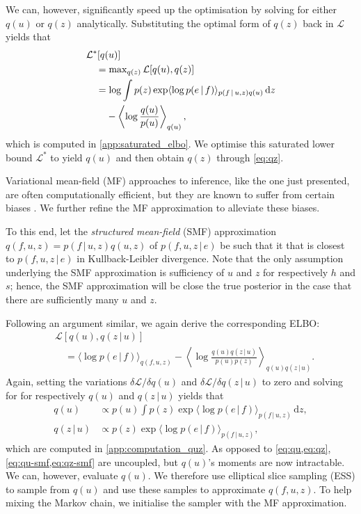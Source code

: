 \documentclass{article}
\renewcommand{\max}{\operatorname{max}}
\newcommand{\id}[1]{\, \mathrm{d} #1}     %
\newcommand{\cond}{\, | \,}               %
\renewcommand{\ll}{\left}
\newcommand{\rr}{\right}
\newcommand{\la}{\langle}
\newcommand{\ra}{\rangle}
\newcommand{\phan}[1]{\hphantom{#1\;}}
\begin{document}
We can, however, significantly speed up the optimisation by solving for either $q(u)$ or $q(z)$ analytically. Substituting the optimal form of $q(z)$ back in $\mathcal{L}$ yields that
\begin{align}
    &\mathcal{L}^*[q(u)] \nonumber\\
    &\quad=\max_{q(z)} \mathcal{L}[q(u),q(z)]\nonumber\\
    &\quad= \log \int p(z)\exp \la \log p(e\cond f) \ra_{p(f\cond u, z)q(u)} \id{z} \nonumber\\
    &\quad\phan{=}-\ll\la\log\frac{q(u)}{p(u)}\rr\ra_{q(u)},\label{eq:saturated_elbo}
\end{align}
which is computed in \cref{app:saturated_elbo}. We optimise this saturated lower bound $\mathcal{L}^*$ to yield $q(u)$ and then obtain $q(z)$ through \cref{eq:qz}.

Variational mean-field (MF) approaches to inference, like the one just presented, are often computationally efficient, but they are known to suffer from certain biases \cite{MacKay:2002:Information_Theory_Learning,Turner:2011:Two_Problems_With_Variational_Expectation,Murphy:2012:Probabilistic_Perspective}. We further refine the MF approximation to alleviate these biases.

To this end, let the \textit{structured mean-field} (SMF) approximation $q(f,u,z)=p(f\cond u, z)q(u,z)$ of $p(f,u,z\cond e)$ be such that it that is closest to $p(f,u,z\cond e)$ in Kullback-Leibler divergence. Note that the only assumption underlying the SMF approximation is sufficiency of $u$ and $z$ for respectively $h$ and $s$; hence, the SMF approximation will be close the true posterior in the case that there are sufficiently many $u$ and $z$.

Following an argument similar, we again derive the corresponding ELBO:
\begin{align*}
    &\mathcal{L}[q(u),q(z\cond u)] \\
    &\quad= \la \log p(e\cond f) \ra_{q(f,u,z)}- \ll\la\log\frac{q(u)q(z\cond u)}{p(u)p(z)}\rr\ra_{q(u)q(z\cond u)}.
\end{align*}
Again, setting the variations $\delta \mathcal{L} / \delta q(u)$ and $\delta \mathcal{L} / \delta q(z\cond u)$ to zero and solving for for respectively $q(u)$ and $q(z\cond u)$ yields that
\begin{align}
    q(u) &\propto p(u) \int p(z) \exp\la\log p(e\cond f)\ra_{p(f\cond u, z)}\id{z}, \label{eq:qu-smf} \\
    q(z\cond u) &\propto p(z)\exp\la \log p(e\cond f)\ra_{p(f\cond u, z)}, \label{eq:qz-smf}
\end{align}
which are computed in \cref{app:computation_quz}.
As opposed to \cref{eq:qu,eq:qz}, \cref{eq:qu-smf,eq:qz-smf} are uncoupled, but $q(u)$'s moments are now intractable. We can, however, evaluate $q(u)$. We therefore use elliptical slice sampling (ESS) \cite{Murray:2010:Elliptical_Slice_Sampling} to sample from $q(u)$ and use these samples to approximate $q(f, u, z)$. To help mixing the Markov chain, we initialise the sampler with the MF approximation.
\end{document}
